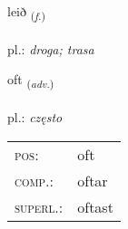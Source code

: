 \documentclass[frontgrid, backgrid]{flacards}\usepackage[]{graphicx}\usepackage[]{xcolor}
\begin{document}
\renewcommand{\flhead}{\vskip5pt \fboxsep=0pt {\small\bfseries\footnotesize Nafnorð | Noun}}
\renewcommand{\fcfoot}{\vskip5pt \fboxsep=0pt \hspace{2pt}{\small\bfseries\footnotesize 1K}}

\renewcommand{\blhead}{\vskip5pt {\small\bfseries\footnotesize Nafnorð | Noun }}
\renewcommand{\bcfoot}{\vskip5pt \hspace{2pt}{\small\bfseries\footnotesize 1K}}


{leið \small{\textsubscript{(\textit{f.})}} \\[1ex] %
\textphonetic{[leiːð]} \\
pl.: \emph{droga; trasa} \\  [2ex]
\renewcommand*{\arraystretch}{0.8}
}

\renewcommand{\flhead}{\vskip5pt \fboxsep=0pt {\small\bfseries\footnotesize Atviksorð | Adverb}}
\renewcommand{\fcfoot}{\vskip5pt \fboxsep=0pt \hspace{2pt}{\small\bfseries\footnotesize 1K}}

\renewcommand{\blhead}{\vskip5pt {\small\bfseries\footnotesize Atviksorð | Adverb }}
\renewcommand{\bcfoot}{\vskip5pt \hspace{2pt}{\small\bfseries\footnotesize 1K}}


{oft \small{\textsubscript{(\textit{adv.})}} \\[1ex] %
\textphonetic{[ɔft]} \\
pl.: \emph{często} \\  [2ex]
\renewcommand*{\arraystretch}{0.8}
\begin{tabular}{ll}
\textsc{pos}: & oft \\ 
\textsc{comp.}: & oftar \\ 
\textsc{superl.}: & oftast \\
\end{tabular}
}
\end{document}

